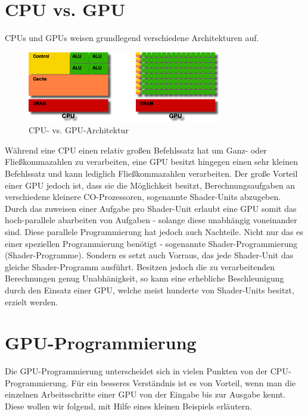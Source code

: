 \begin{Spacing}{\mylinespace}
\section{CPU vs. GPU}
CPUs und GPUs weisen grundlegend verschiedene Architekturen auf.
\begin{figure}[h!]
	\vspace*{30px}
	\centering
	\includegraphics[width=320px]{graphics/GPUvsCPU.png}	
	\caption{CPU- vs. GPU-Architektur}
	\label{fig:GPUvsCPU}
\end{figure}

Während eine CPU einen relativ großen Befehlssatz hat um Ganz- oder Fließkommazahlen zu verarbeiten, eine GPU  besitzt hingegen einen sehr kleinen Befehlssatz und kann lediglich Fließkommazahlen verarbeiten.
Der große Vorteil einer GPU jedoch ist, dass sie die Möglichkeit besitzt, Berechnungsaufgaben an verschiedene kleinere CO-Prozessoren, sogenannte Shader-Units abzugeben. Durch das zuweisen einer Aufgabe pro Shader-Unit erlaubt eine GPU somit das hoch-parallele abarbeiten von Aufgaben - solange diese unabhängig voneinander sind.
Diese parallele Programmierung hat jedoch auch Nachteile.
Nicht nur das es einer speziellen Programmierung benötigt - sogenannte Shader-Programmierung (Shader-Programme).
Sondern es setzt auch Vorraus, das jede Shader-Unit das gleiche Shader-Programm ausführt. Besitzen jedoch die zu verarbeitenden Berechnungen genug Unabhänigkeit, so kann eine erhebliche Beschleunigung durch den Einsatz einer GPU, welche meist hunderte von Shader-Units besitzt, erzielt werden.


\section{GPU-Programmierung}

Die GPU-Programmierung unterscheidet sich in vielen Punkten von der CPU-Programmierung. Für ein besseres Verständnis ist es von Vorteil, wenn man die einzelnen Arbeitsschritte einer GPU von der Eingabe bis zur Ausgabe kennt. Diese wollen wir folgend, mit Hilfe eines kleinen Beispiels erläutern.


\end{Spacing}
